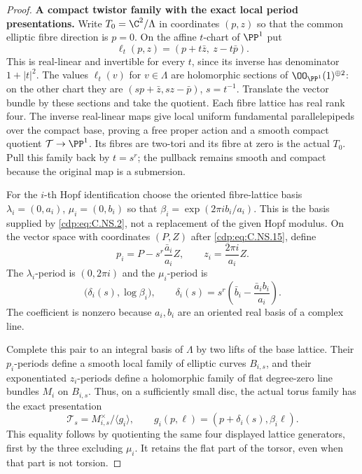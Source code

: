 \begin{proof}
\par\medskip\noindent\textbf{A compact twistor family with the exact local period presentations.}
Write $T_0=\C^2/\Lambda$ in coordinates $(p,z)$
so that the common elliptic fibre direction is
$p=0$. On the affine $t$-chart of $\PP^1$ put
\[
 \ell_t(p,z)=(p+t\bar z,\ z-t\bar p).
                                                        \tag{C.NS.15}\label{cdp:eq:C.NS.15}
\]
This is real-linear and invertible for every
$t$, since its inverse has denominator
$1+|t|^2$. The values $\ell_t(v)$ for
$v\in\Lambda$ are holomorphic sections of
$\OO_{\PP^1}(1)^{\oplus2}$: on the other chart
they are $(s p+\bar z,s z-\bar p)$, $s=t^{-1}$.
Translate the vector bundle by these sections
and take the quotient. Each fibre lattice has
real rank four. The inverse real-linear maps
give local uniform fundamental parallelepipeds
over the compact base, proving a free proper
action and a smooth compact quotient
$\mathcal T\to\PP^1$. Its fibres are two-tori
and its fibre at zero is the actual $T_0$.
Pull this family back by $t=s^r$; the pullback
remains smooth and compact because the
original map is a submersion.

For the $i$-th Hopf identification choose the
oriented fibre-lattice basis
$\lambda_i=(0,a_i)$, $\mu_i=(0,b_i)$ so that
$\beta_i=\exp(2\pi i b_i/a_i)$. This is the
basis supplied by \eqref{cdp:eq:C.NS.2}, not a replacement
of the given Hopf modulus. On the vector
space with coordinates $(P,Z)$ after
\eqref{cdp:eq:C.NS.15}, define
\[
 p_i=P-s^r\frac{\bar a_i}{a_i}Z,\qquad
 z_i=\frac{2\pi i}{a_i}Z.
                                                        \tag{C.NS.16}\label{cdp:eq:C.NS.16}
\]
The $\lambda_i$-period is $(0,2\pi i)$ and
the $\mu_i$-period is
\[
   \bigl(\delta_i(s),\log\beta_i\bigr),\qquad
   \delta_i(s)=s^r
        \left(\bar b_i-\frac{\bar a_i b_i}{a_i}\right).
                                                        \tag{C.NS.17}\label{cdp:eq:C.NS.17}
\]
The coefficient is nonzero because $a_i,b_i$
are an oriented real basis of a complex line.

Complete this pair to an integral basis of
$\Lambda$ by two lifts of the base lattice.
Their $p_i$-periods define a smooth local
family of elliptic curves $B_{i,s}$, and
their exponentiated $z_i$-periods define a
holomorphic family of flat degree-zero line
bundles $M_i$ on $B_{i,s}$. Thus, on a
sufficiently small disc, the actual torus
family has the exact presentation
\[
 \mathcal T_s
   =M_{i,s}^{\times}/\langle g_i\rangle,\qquad
 g_i(p,\ell)=(p+\delta_i(s),\beta_i\ell).
                                                        \tag{C.NS.18}\label{cdp:eq:C.NS.18}
\]
This equality follows by quotienting the
same four displayed lattice generators,
first by the three excluding $\mu_i$.
It retains the flat part of the torsor,
even when that part is not torsion.


\end{proof}
